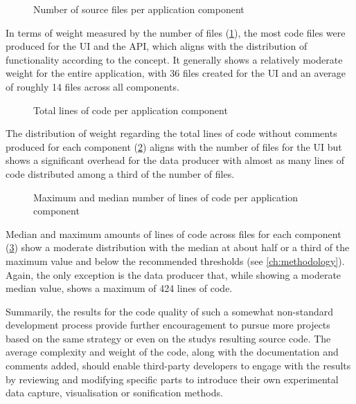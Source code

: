 \begin{figure}[h]
\centering

\caption[File count]{Number of source files per application component\protect}
\label{fig:fileCount}
\end{figure}

In terms of weight measured by the number of files (\ref{fig:fileCount}), the most code files were produced for the \ac{UI} and the \ac{API}, which aligns with the distribution of functionality according to the concept.
It generally shows a relatively moderate weight for the entire application, with 36 files created for the \ac{UI} and an average of roughly 14 files across all components.

\begin{figure}[h]
\centering

\caption[Lines of code (total)]{Total lines of code per application component\protect}
\label{fig:linesOfCodeTotal}
\end{figure}

The distribution of weight regarding the total lines of code without comments produced for each component (\ref{fig:linesOfCodeTotal}) aligns with the number of files for the \ac{UI} but shows a significant overhead for the data producer with almost as many lines of code distributed among a third of the number of files.

\begin{figure}[h]
\centering

\caption[Lines of code]{Maximum and median number of lines of code per application component\protect}
\label{fig:linesOfCode}
\end{figure}

Median and maximum amounts of lines of code across files for each component (\ref{fig:linesOfCode}) show a moderate distribution with the median at about half or a third of the maximum value and below the recommended thresholds (see \autoref{ch:methodology}).
Again, the only exception is the data producer that, while showing a moderate median value, shows a maximum of 424 lines of code.

Summarily, the results for the code quality of such a somewhat non-standard development process provide further encouragement to pursue more projects based on the same strategy or even on the study\textquotesingle s resulting source code.
The average complexity and weight of the code, along with the documentation and comments added, should enable third-party developers to engage with the results by reviewing and modifying specific parts to introduce their own experimental data capture, visualisation or sonification methods.


